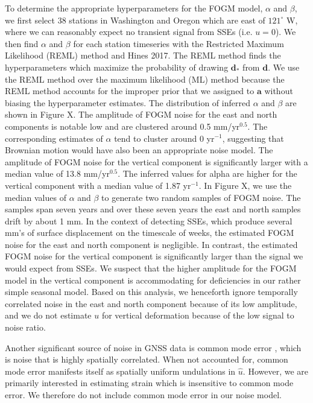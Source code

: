 \documentclass[10pt,a4paper]{article}
\begin{document}
To determine the appropriate hyperparameters for the FOGM model, $\alpha$ and $\beta$, we first select 38 stations in Washington and Oregon which are east of $121^\circ$ W, where we can reasonably expect no transient signal from SSEs (i.e. $u = 0$). We then find $\alpha$ and $\beta$ for each station timeseries with the Restricted Maximum Likelihood (REML) method \cite[e.g.,][]{Harville1974,Cressie1992} and Hines 2017. The REML method finds the hyperparameters which maximize the probability of drawing $\bm{d}_*$ from $\bm{d}$. We use the REML method over the maximum likelihood (ML) method \citep[e.g.,][]{Langbein1997} because the REML method accounts for the improper prior that we assigned to $\bm{a}$ without biasing the hyperparameter estimates. The distribution of inferred $\alpha$ and $\beta$ are shown in Figure X. The amplitude of FOGM noise for the east and north components is notable low and are clustered around 0.5 mm/yr$^{0.5}$. The corresponding estimates of $\alpha$ tend to cluster around 0 yr$^{-1}$, suggesting that Brownian motion would have also been an appropriate noise model.  The amplitude of FOGM noise for the vertical component is significantly larger with a median value of 13.8 mm/yr$^{0.5}$. The inferred values for alpha are higher for the vertical component with a median value of 1.87 yr$^{-1}$. In Figure X, we use the median values of $\alpha$ and $\beta$ to generate two random samples of FOGM noise. The samples span seven years and over these seven years the east and north samples drift by about 1 mm. In the context of detecting SSEs, which produce several mm's of surface displacement on the timescale of weeks, the estimated FOGM noise for the east and north component is negligible. In contrast, the estimated FOGM noise for the vertical component is significantly larger than the signal we would expect from SSEs. We suspect that the higher amplitude for the FOGM model in the vertical component is accommodating for deficiencies in our rather simple seasonal model. Based on this analysis, we henceforth ignore temporally correlated noise in the east and north component because of its low amplitude, and we do not estimate $u$ for vertical deformation because of the low signal to noise ratio.

Another significant source of noise in GNSS data is common mode error \citep[e.g.,][]{Wdowinski1997,Dong2006}, which is noise that is highly spatially correlated. When not accounted for, common mode error manifests itself as spatially uniform undulations in $\hat{u}$. However, we are primarily interested in estimating strain which is insensitive to common mode error. We therefore do not include common mode error in our noise model. 
\end{document}

